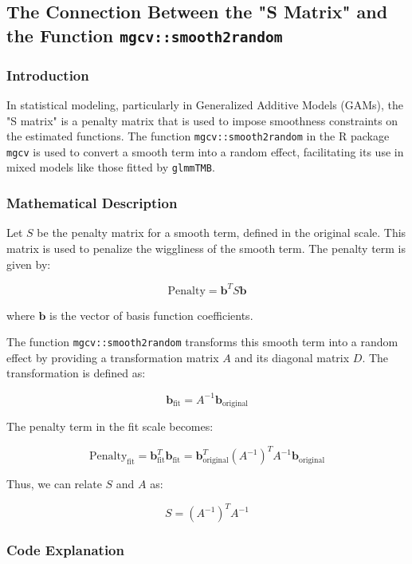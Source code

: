 \subsection{The Connection Between the "S Matrix" and the Function \texttt{mgcv::smooth2random}}

\subsubsection{Introduction}

In statistical modeling, particularly in Generalized Additive Models (GAMs), the "S matrix" is a penalty matrix that is used to impose smoothness constraints on the estimated functions. The function \texttt{mgcv::smooth2random} in the R package \texttt{mgcv} is used to convert a smooth term into a random effect, facilitating its use in mixed models like those fitted by \texttt{glmmTMB}.

\subsubsection{Mathematical Description}

Let \( S \) be the penalty matrix for a smooth term, defined in the original scale. This matrix is used to penalize the wiggliness of the smooth term. The penalty term is given by:

\[
\text{Penalty} = \mathbf{b}^T S \mathbf{b}
\]

where \( \mathbf{b} \) is the vector of basis function coefficients.

The function \texttt{mgcv::smooth2random} transforms this smooth term into a random effect by providing a transformation matrix \( A \) and its diagonal matrix \( D \). The transformation is defined as:

\[
\mathbf{b}_{\text{fit}} = A^{-1} \mathbf{b}_{\text{original}}
\]

The penalty term in the fit scale becomes:

\[
\text{Penalty}_{\text{fit}} = \mathbf{b}_{\text{fit}}^T \mathbf{b}_{\text{fit}} = \mathbf{b}_{\text{original}}^T (A^{-1})^T A^{-1} \mathbf{b}_{\text{original}}
\]

Thus, we can relate \( S \) and \( A \) as:

\[
S = (A^{-1})^T A^{-1}
\]

\subsubsection{Code Explanation}

